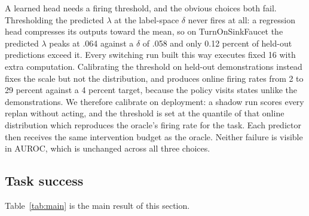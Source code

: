 A learned head needs a firing threshold, and the obvious choices both fail.
Thresholding the predicted $\lambda$ at the label-space $\delta$ never fires at
all: a regression head compresses its outputs toward the mean, so on
TurnOnSinkFaucet the predicted $\lambda$ peaks at .064 against a $\delta$ of
.058 and only 0.12 percent of held-out predictions exceed it. Every switching
run built this way executes fixed 16 with extra computation. Calibrating the
threshold on held-out demonstrations instead fixes the scale but not the
distribution, and produces online firing rates from 2 to 29 percent against a 4
percent target, because the policy visits states unlike the demonstrations. We
therefore calibrate on deployment: a shadow run scores every replan without
acting, and the threshold is set at the quantile of that online distribution
which reproduces the oracle's firing rate for the task. Each predictor then
receives the same intervention budget as the oracle. Neither failure is visible
in AUROC, which is unchanged across all three choices.

\subsection{Task success}

Table~\ref{tab:main} is the main result of this section.

